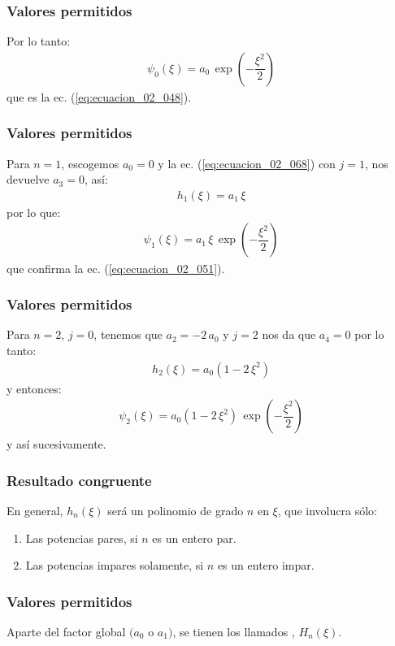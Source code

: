 \documentclass[12pt]{beamer}
\begin{document}
\begin{frame}
\frametitle{Valores permitidos}
Por lo tanto:
\pause
\begin{align*}
\psi_{0} (\xi) = a_{0} \, \exp \left( - \dfrac{\xi^{2}}{2} \right)
\end{align*}
que es la ec. (\ref{eq:ecuacion_02_048}).
\end{frame}
\begin{frame}
\frametitle{Valores permitidos}
Para $n=1$, \pause escogemos $a_{0} = 0$ y la ec. (\ref{eq:ecuacion_02_068}) con $j = 1$, nos devuelve $a_{3} = 0$, así:
\pause
\begin{align*}
h_{1} (\xi) = a_{1} \, \xi
\end{align*}
\pause
por lo que:
\pause
\begin{align*}
\psi_{1} (\xi) = a_{1} \, \xi \, \exp \left( - \dfrac{\xi^{2}}{2} \right)
\end{align*}
que confirma la ec. (\ref{eq:ecuacion_02_051}).
\end{frame}
\begin{frame}
\frametitle{Valores permitidos}
Para $n = 2$, \pause $j = 0$, tenemos que $a_{2} = - 2 \, a_{0}$ y $j = 2$ nos da que $a_{4} = 0$ por lo tanto:
\pause
\begin{align*}
h_{2} (\xi) = a_{0} (1 - 2 \, \xi^{2})
\end{align*}
\pause
y entonces:
\pause
\begin{align*}
\psi_{2} (\xi) = a_{0} (1 - 2 \, \xi^{2}) \, \exp \left( - \dfrac{\xi^{2}}{2} \right)
\end{align*}
y así sucesivamente.
\end{frame}
\begin{frame}
\frametitle{Resultado congruente}
En general, $h_{n} (\xi)$ será un polinomio de grado $n$ en $\xi$, que involucra sólo:
\begin{enumerate}[<+->]
\item Las potencias pares, si $n$ es un entero par.
\item Las potencias impares solamente, si $n$ es un entero impar.
\end{enumerate}
\end{frame}
\begin{frame}
\frametitle{Valores permitidos}
Aparte del factor global $(a_{0}$ o $a_{1})$, se tienen los llamados , $H_{n} (\xi)$.
\end{frame}
\end{document}
